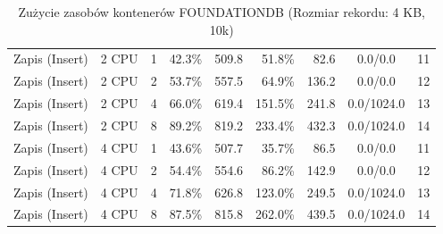 \begin{table}[ht]
{\begin{tabular}{llcrrrrcc}
Zapis (Insert) & 2 CPU & 1 & 42.3\% & 509.8 & 51.8\% & 82.6 & 0.0/0.0 & 11 \\
Zapis (Insert) & 2 CPU & 2 & 53.7\% & 557.5 & 64.9\% & 136.2 & 0.0/0.0 & 12 \\
Zapis (Insert) & 2 CPU & 4 & 66.0\% & 619.4 & 151.5\% & 241.8 & 0.0/1024.0 & 13 \\
Zapis (Insert) & 2 CPU & 8 & 89.2\% & 819.2 & 233.4\% & 432.3 & 0.0/1024.0 & 14 \\
Zapis (Insert) & 4 CPU & 1 & 43.6\% & 507.7 & 35.7\% & 86.5 & 0.0/0.0 & 11 \\
Zapis (Insert) & 4 CPU & 2 & 54.4\% & 554.6 & 86.2\% & 142.9 & 0.0/0.0 & 12 \\
Zapis (Insert) & 4 CPU & 4 & 71.8\% & 626.8 & 123.0\% & 249.5 & 0.0/1024.0 & 13 \\
Zapis (Insert) & 4 CPU & 8 & 87.5\% & 815.8 & 262.0\% & 439.5 & 0.0/1024.0 & 14 \\
\bottomrule
\end{tabular}%
}
\caption{Zużycie zasobów kontenerów FOUNDATIONDB (Rozmiar rekordu: 4 KB, 10k)}
\label{tab:resources_foundationdb_medium_10000}
\end{table}
